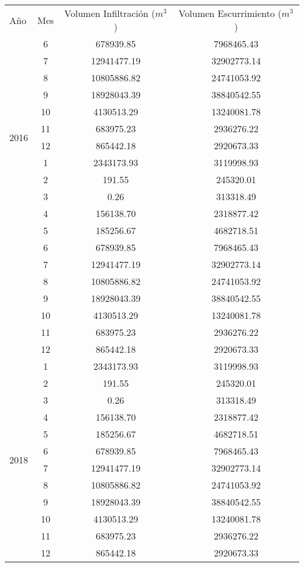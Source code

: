 \documentclass[12pt,letterpaper]{article}
\begin{document}
\begin{table}[H]
\centering
\begin{tabular}{l|c|c|c}
\hline
Año & Mes & Volumen Infiltración ($m^3$) & Volumen Escurrimiento ($m^3$) \\
\cline{1-4}
\multirow[t]{12}{*}{2016} & 6 & 678939.85 & 7968465.43 \\
& 7 & 12941477.19 & 32902773.14 \\ 
 & 8 & 10805886.82 & 24741053.92 \\
 & 9 & 18928043.39 & 38840542.55 \\
 & 10 & 4130513.29 & 13240081.78 \\
 & 11 & 683975.23 & 2936276.22 \\
 & 12 & 865442.18 & 2920673.33 \\
\cline{1-4}
\multirow[t]{12}{*}{2017} & 1 & 2343173.93 & 3119998.93 \\
 & 2 & 191.55 & 245320.01 \\
 & 3 & 0.26 & 313318.49 \\
 & 4 & 156138.70 & 2318877.42 \\
 & 5 & 185256.67 & 4682718.51 \\
 & 6 & 678939.85 & 7968465.43 \\
 & 7 & 12941477.19 & 32902773.14 \\
 & 8 & 10805886.82 & 24741053.92 \\
 & 9 & 18928043.39 & 38840542.55 \\
 & 10 & 4130513.29 & 13240081.78 \\
 & 11 & 683975.23 & 2936276.22 \\
 & 12 & 865442.18 & 2920673.33 \\
\cline{1-4}
\multirow[t]{12}{*}{2018} & 1 & 2343173.93 & 3119998.93 \\
 & 2 & 191.55 & 245320.01 \\
 & 3 & 0.26 & 313318.49 \\
 & 4 & 156138.70 & 2318877.42 \\
 & 5 & 185256.67 & 4682718.51 \\
 & 6 & 678939.85 & 7968465.43 \\
 & 7 & 12941477.19 & 32902773.14 \\
 & 8 & 10805886.82 & 24741053.92 \\
 & 9 & 18928043.39 & 38840542.55 \\
 & 10 & 4130513.29 & 13240081.78 \\
 & 11 & 683975.23 & 2936276.22 \\
 & 12 & 865442.18 & 2920673.33 \\

\end{tabular}
\end{table}
\end{document}
